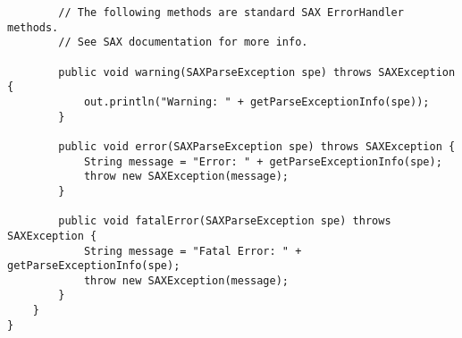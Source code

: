 \documentclass[11pt,english]{article}
\begin{document}
\begin{lstlisting}
        // The following methods are standard SAX ErrorHandler methods.
        // See SAX documentation for more info.

        public void warning(SAXParseException spe) throws SAXException {
            out.println("Warning: " + getParseExceptionInfo(spe));
        }

        public void error(SAXParseException spe) throws SAXException {
            String message = "Error: " + getParseExceptionInfo(spe);
            throw new SAXException(message);
        }

        public void fatalError(SAXParseException spe) throws SAXException {
            String message = "Fatal Error: " + getParseExceptionInfo(spe);
            throw new SAXException(message);
        }
    }
}

\end{lstlisting}
\end{document}
